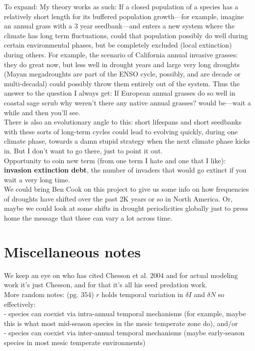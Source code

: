 \documentclass[11pt,a4paper,oneside]{article}
\begin{document}
To expand: My theory works as such: If a closed population of a species has a relatively short length for its buffered population growth---for example, imagine an annual grass with a 3 year seedbank---and enters a new system where the climate has long term fluctuations, could that population possibly do well during certain environmental phases, but be completely excluded (local extinction) during others. For example, the scenario of California annual invasive grasses: they do great now, but less well in drought years and large very long droughts (Mayan megadroughts are part of the ENSO cycle, possibly, and are decade or multi-decadal) could possibly throw them entirely out of the system. Thus the answer to the question I always get: If European annual grasses do so well in coastal sage scrub why weren't there any native annual grasses? would be---wait a while and  then you'll see. \\

There is also an evolutionary angle to this: short lifespans and short seedbanks with these sorts of long-term cycles could lead to evolving quickly, during one climate phase, towards a damn stupid strategy when the next climate phase kicks in. But I don't want to go there, just to point it out.\\

\noindent Opportunity to coin new term (from one term I hate and one that I like): {\bf invasion extinction debt}, the number of invaders that would go extinct if you wait a very long time. \\

\noindent We could bring Ben Cook on this project to give us some info on how frequencies of droughts have shifted over the past 2K years or so in North America. Or, maybe we could look at some shifts in drought periodicities globally just to press home the message that these can vary a lot across time. 

\section{Miscellaneous notes}
\noindent We keep an eye on who has cited Chesson et al. 2004
and for actual modeling work it's just Chesson, and for that it's all
his seed predation work.\\

\noindent More random notes: \citet{Chesson:2000vd} (pg. 354) \(r\) holds temporal variation in \(\delta I\) and \(\delta N\) so effectively:\\
- species can coexist via intra-annual temporal mechanisms (for example, maybe this is what most mid-season species in the mesic temperate zone do), and/or\\
- species can coexist via inter-annual temporal mechanisms (maybe early-season species in most mesic temperate environments)\\
\end{document}
